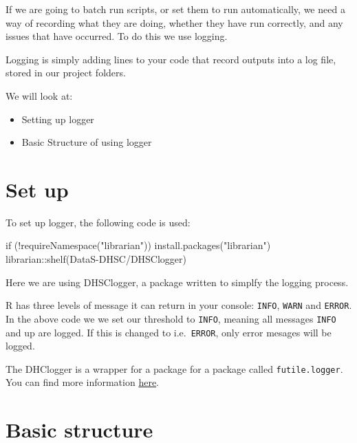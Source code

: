 \documentclass[
  letterpaper,
]{book}
\newenvironment{Shaded}{\begin{snugshade}}{\end{snugshade}}
\newcommand{\ControlFlowTok}[1]{\textcolor[rgb]{0.00,0.23,0.31}{#1}}
\newcommand{\FunctionTok}[1]{\textcolor[rgb]{0.28,0.35,0.67}{#1}}
\newcommand{\NormalTok}[1]{\textcolor[rgb]{0.00,0.23,0.31}{#1}}
\newcommand{\SpecialCharTok}[1]{\textcolor[rgb]{0.37,0.37,0.37}{#1}}
\newcommand{\StringTok}[1]{\textcolor[rgb]{0.13,0.47,0.30}{#1}}
\providecommand{\tightlist}{%
  \setlength{\itemsep}{0pt}\setlength{\parskip}{0pt}}\usepackage{longtable,booktabs,array}
\begin{document}
If we are going to batch run scripts, or set them to run automatically,
we need a way of recording what they are doing, whether they have run
correctly, and any issues that have occurred. To do this we use logging.

Logging is simply adding lines to your code that record outputs into a
log file, stored in our project folders.

We will look at:

\begin{itemize}
\tightlist
\item
  Setting up logger
\item
  Basic Structure of using logger
\end{itemize}

\hypertarget{set-up}{%
\section{Set up}\label{set-up}}

To set up logger, the following code is used:

\begin{Shaded}
\begin{Highlighting}[]
\ControlFlowTok{if}\NormalTok{ (}\SpecialCharTok{!}\FunctionTok{requireNamespace}\NormalTok{(}\StringTok{"librarian"}\NormalTok{)) }\FunctionTok{install.packages}\NormalTok{(}\StringTok{"librarian"}\NormalTok{)}
\NormalTok{librarian}\SpecialCharTok{::}\FunctionTok{shelf}\NormalTok{(DataS}\SpecialCharTok{{-}}\NormalTok{DHSC}\SpecialCharTok{/}\NormalTok{DHSClogger)}
\end{Highlighting}
\end{Shaded}

Here we are using DHSClogger, a package written to simplfy the logging
process.

R has three levels of message it can return in your console:
\texttt{INFO}, \texttt{WARN} and \texttt{ERROR}. In the above code we we
set our threshold to \texttt{INFO}, meaning all messages \texttt{INFO}
and up are logged. If this is changed to i.e.~\texttt{ERROR}, only error
mesages will be logged.

The DHClogger is a wrapper for a package for a package called
\texttt{futile.logger}. You can find more information
\href{https://github.com/zatonovo/futile.logger}{here}.

\hypertarget{basic-structure-1}{%
\section{Basic structure}\label{basic-structure-1}}
\end{document}
